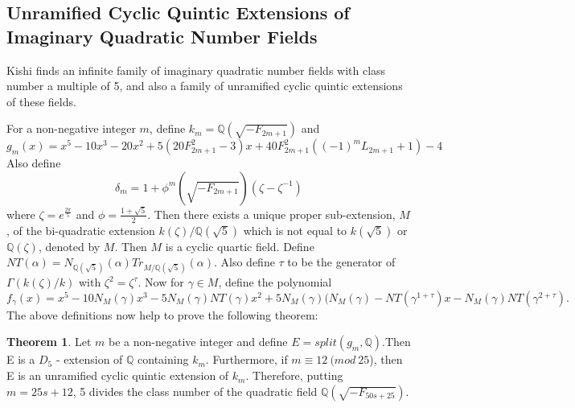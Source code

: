 \documentclass[12pt]{extarticle}
\newcommand{\Q}{\mathbb{Q}}
\newcommand{\<}{\langle}
\renewcommand{\>}{\rangle}
\theoremstyle{definition}
\newtheorem{theorem}{Theorem}
\begin{document}
\subsection{Unramified Cyclic Quintic Extensions of Imaginary Quadratic Number Fields}


Kishi \cite{KISH} finds an infinite family of imaginary quadratic number fields with class number a multiple of 5, and also a family of unramified cyclic quintic extensions of these fields. 

 For a non-negative integer $m$, define $k_m = \Q(\sqrt{-F_{2m+1}})$ and \begin{equation}
    g_m(x) = x^5 - 10x^3  -20x^2 + 
    5(20F^2_{2m+1} - 3)x
    + 40F^2_{2m+1}((-1)^{m}L_{2m+1} + 1)- 4
\end{equation} 
Also define \begin{equation}
    \delta_m = 1+\phi^m(\sqrt{-F_{2m+1}})(\zeta-\zeta^{-1})
\end{equation} where $\zeta = e^{\frac{2\pi}{5}}$ and $\phi = \frac{1+\sqrt{5}}{2}$. Then there exists a unique proper sub-extension, $M$, of the bi-quadratic
extension $k(\zeta)/\Q(\sqrt{5})$ which is not equal to $k(\sqrt{5})$ or $\Q(\zeta)$, denoted by $M$. Then $M$ is a cyclic quartic field. Define $NT(\alpha) = N_{\Q(\sqrt{5})}(\alpha)Tr_{M/\Q(\sqrt{5})}(\alpha)$. Also define $\tau$ to be the generator of $\Gamma(k(\zeta)/k)$ with $\zeta^2=\zeta^\tau$.
Now for $\gamma \in M$, define the polynomial \begin{equation}
    f_\gamma(x) = x^5 - 10N_M(\gamma)x^3 - 5N_M(\gamma)NT (\gamma)x^2
+ 5N_M(\gamma)(N_M(\gamma) - NT(\gamma^{1+\tau})x - N_M(\gamma)NT(\gamma^{2+\tau}) 
.
\end{equation}
The above definitions now help to prove the following theorem:  
\begin{theorem}
    Let $m$ be a non-negative integer and define $E = split(g_m,\Q)$.Then E is a $D_5$ - extension
of $\Q$ containing $k_m$. Furthermore, if $m \equiv 12 \:(mod\:25$), then E is an unramified cyclic quintic extension of $k_m$. Therefore, putting $m = 25s + 12$, 5 divides the class number of the quadratic field $\Q(\sqrt{-F_{50s+25}})$.
\end{theorem}
\end{document}
